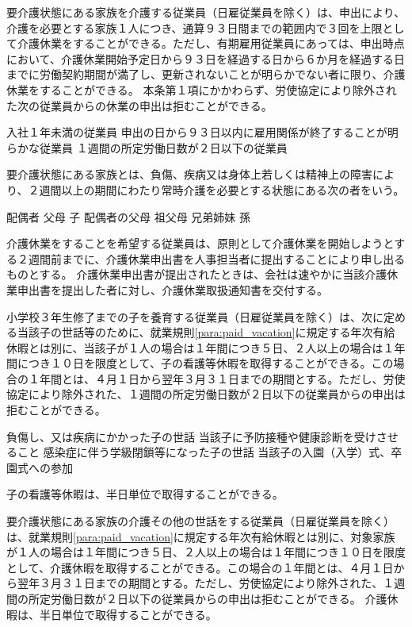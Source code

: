 \documentclass[10pt,a4paper,uplatex]{jsarticle}
\begin{document}
要介護状態にある家族を介護する従業員（日雇従業員を除く）は、申出により、介護を必要とする家族１人につき、通算９３日間までの範囲内で３回を上限として介護休業をすることができる。ただし、有期雇用従業員にあっては、申出時点において、介護休業開始予定日から９３日を経過する日から６か月を経過する日までに労働契約期間が満了し、更新されないことが明らかでない者に限り、介護休業をすることができる。
\label{para:NursingLayoff}
\term 本条第１項にかかわらず、労使協定により除外された次の従業員からの休業の申出は拒むことができる。
\begin{enumerate}
    \itm 入社１年未満の従業員
    \itm 申出の日から９３日以内に雇用関係が終了することが明らかな従業員
    \itm １週間の所定労働日数が２日以下の従業員
\end{enumerate}
\term 要介護状態にある家族とは、負傷、疾病又は身体上若しくは精神上の障害により、２週間以上の期間にわたり常時介護を必要とする状態にある次の者をいう。
\begin{enumerate}
    \itm 配偶者
    \itm 父母
    \itm 子
    \itm 配偶者の父母
    \itm 祖父母
    \itm 兄弟姉妹
    \itm 孫
\end{enumerate}
\term 介護休業をすることを希望する従業員は、原則として介護休業を開始しようとする２週間前までに、介護休業申出書を人事担当者に提出することにより申し出るものとする。
\term 介護休業申出書が提出されたときは、会社は速やかに当該介護休業申出書を提出した者に対し、介護休業取扱通知書を交付する。

小学校３年生修了までの子を養育する従業員（日雇従業員を除く）は、次に定める当該子の世話等のために、就業規則\ref{para:paid_vacation}に規定する年次有給休暇とは別に、当該子が１人の場合は１年間につき５日、２人以上の場合は１年間につき１０日を限度として、子の看護等休暇を取得することができる。この場合の１年間とは、４月１日から翌年３月３１日までの期間とする。ただし、労使協定により除外された、１週間の所定労働日数が２日以下の従業員からの申出は拒むことができる。
\label{para:ChildNursingAbsence}
\begin{enumerate}
    \itm 負傷し、又は疾病にかかった子の世話
    \itm 当該子に予防接種や健康診断を受けさせること
    \itm 感染症に伴う学級閉鎖等になった子の世話
    \itm 当該子の入園（入学）式、卒園式への参加
\end{enumerate}
\term 子の看護等休暇は、半日単位で取得することができる。

要介護状態にある家族の介護その他の世話をする従業員（日雇従業員を除く）は、就業規則\ref{para:paid_vacation}に規定する年次有給休暇とは別に、対象家族が１人の場合は１年間につき５日、２人以上の場合は１年間につき１０日を限度として、介護休暇を取得することができる。この場合の１年間とは、４月１日から翌年３月３１日までの期間とする。ただし、労使協定により除外された、１週間の所定労働日数が２日以下の従業員からの申出は拒むことができる。
\label{para:NursingAbsence}
\term 介護休暇は、半日単位で取得することができる。
\end{document}
